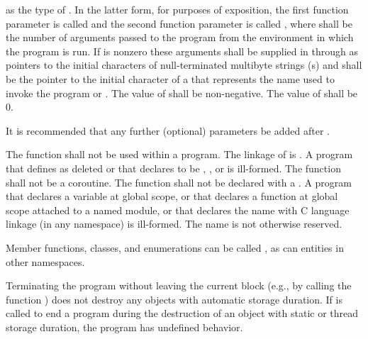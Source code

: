 %
%
as the type of .
%
%
In the latter form, for purposes of exposition, the first function
parameter is called  and the second function parameter is
called , where  shall be the number of
arguments passed to the program from the environment in which the
program is run. If
 is nonzero these arguments shall be supplied in
 through  as pointers to the initial
characters of null-terminated multibyte strings (\ntmbs{}s)
and  shall be the pointer to
the initial character of a \ntmbs{} that represents the name used to
invoke the program or . The value of  shall be
non-negative. The value of  shall be 0. \begin{note} It
is recommended that any further (optional) parameters be added after
. \end{note}

\pnum
The function  shall not be used within
a program.
%
The linkage of  is
. A program that defines  as
deleted or that declares  to be
, , or  is ill-formed.
The function  shall not be a coroutine.
The  function shall not be declared with a
.
A program that declares a variable  at global scope,
or that declares a function  at global scope attached to a named module,
or that declares the name  with C language linkage (in any namespace)
is ill-formed.
The name  is
not otherwise reserved. \begin{example} Member functions, classes, and
enumerations can be called , as can entities in other
namespaces. \end{example}

\pnum
{}%
%
%
Terminating the program
without leaving the current block (e.g., by calling the function
) does not destroy any
objects with automatic storage duration. If
 is called to end a program during the destruction of
an object with static or thread storage duration, the program has undefined
behavior.

